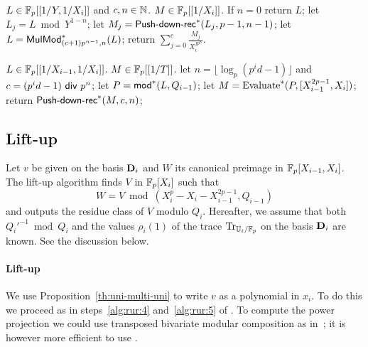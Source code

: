 \begin{algorithm}
  \caption{$\dual{\alg{\text{Push-down-rec}}}$}
  \begin{algorithmic}[1]
    \REQUIRE $L\in\mathbb{F}_p[[1/Y,1/X_i]]$ and $c,n\in\mathbb{N}$.
    \ENSURE $M\in \mathbb{F}_p[[1/X_i]]$.
    \STATE If $n=0$ return $L$;
    \STATE let $L_j = L \bmod Y^{1-n}$;
    \STATE let $M_j=\text{\sf Push-down-rec}^\ast(L_j,p-1,n-1)$;
    \STATE let $L = {\sf MulMod}_{(c+1)p^{n-1},n}^\ast(L)$;
    \ENDFOR
    \STATE return $\sum_{j=0}^{c} \frac{M_j}{X_i^{jp^n}}$.
  \end{algorithmic}
\end{algorithm}

\begin{algorithm}
  \caption{$\dual{\alg{\text{Push-down}}}$}
  \begin{algorithmic}[1]
    \REQUIRE $L\in \mathbb{F}_p[[1/X_{i-1},1/X_i]]$.
    \ENSURE $M \in \mathbb{F}_p[[1/T]]$.
    \STATE let $n=\lfloor \log_p(p^id-1) \rfloor$ and $c=(p^id-1) {\sf~div~} p^n$;
    \STATE let $P={\sf mod}^\ast(L,Q_{i-1})$;
    \STATE let $M = \text{Evaluate}^\ast(P,[X_{i-1}^{2p-1},X_i])$;
    \STATE return $\text{{\sf Push-down-rec}}^\ast(M,c,n)$;
  \end{algorithmic}
\end{algorithm}



\subsection{Lift-up}
\label{sec:level-embedding:lift-up}

Let $v$ be given on the basis $\mathbf{D}_i$ and $W$ its canonical
preimage in $\mathbb{F}_p[X_{i-1},X_i]$.  The lift-up algorithm finds $V$ in
$\mathbb{F}_p[X_i]$ such that
\begin{equation}
  \label{eq:93}
  W=V \bmod
  (X_i^p-X_i-X_{i-1}^{2p-1},Q_{i-1})
\end{equation}
and outputs the residue class of $V$ modulo $Q_i$. Hereafter, we
assume that both $Q_i'^{-1} \bmod Q_i$ and the values $\rho_i(1)$ of
the trace $\operatorname{Tr}_{\mathbb{U}_i/\mathbb{F}_p}$ on the basis $\mathbf{D}_i$ are known.  See
the discussion below.

\paragraph{Lift-up}
We use Proposition~\ref{th:uni-multi-uni} to write $v$ as a
polynomial in $x_i$. To do this we proceed as in steps~\ref{alg:rur:4}
and~\ref{alg:rur:5} of .  To compute the power projection we
could use transposed bivariate modular composition as
in~\cite{shoup99}; it is however more efficient to use
.

